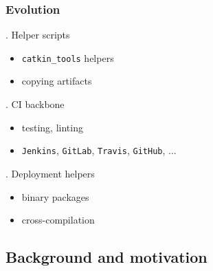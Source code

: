 \documentclass[hyperref={colorlinks=false, breaklinks=true},11pt]{beamer}
\begin{document}
\begin{frame}
    \frametitle{Evolution}

    \begin{block}{. Helper scripts}
        \begin{itemize}
            \item \texttt{catkin\_tools} helpers
            \item copying artifacts
        \end{itemize}
    \end{block}

    \center{{\bf {\Large$\Downarrow$}}}

    \begin{block}{. CI backbone}
        \begin{itemize}
            \item testing, linting
            \item \texttt{Jenkins}, \texttt{GitLab}, \texttt{Travis}, \texttt{GitHub}, ...
        \end{itemize}
    \end{block}

    \center{{\bf {\Large$\Downarrow$}}}

    \begin{block}{. Deployment helpers}
        \begin{itemize}
            \item binary packages
            \item cross-compilation
        \end{itemize}
    \end{block}
\end{frame}

\subsection{Background and motivation}
\end{document}
